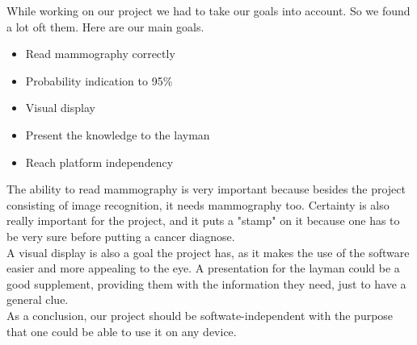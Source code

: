  While working on our project we had to take our goals into account. So we found a lot oft them.  Here are our main goals.
\begin{itemize}
	\item{Read mammography correctly}
	\item{Probability indication to 95\%}
	\item{Visual display}
	\item{Present the knowledge to the layman}
	\item{Reach platform independency}
\end{itemize}
The ability to read mammography is very important because besides the project consisting of image recognition, it needs mammography too. Certainty is also really important for the project, and it puts a "stamp" on it because one has to be very sure before putting a cancer diagnose.\\
 A visual display is also a goal the project has, as it makes the use of the software easier and more appealing to the eye. A presentation for the layman could be a good supplement, providing them with the information they need, just to have a general clue. \\
 As a conclusion, our project should be softwate-independent with the purpose that one could be able to use it on any device.
